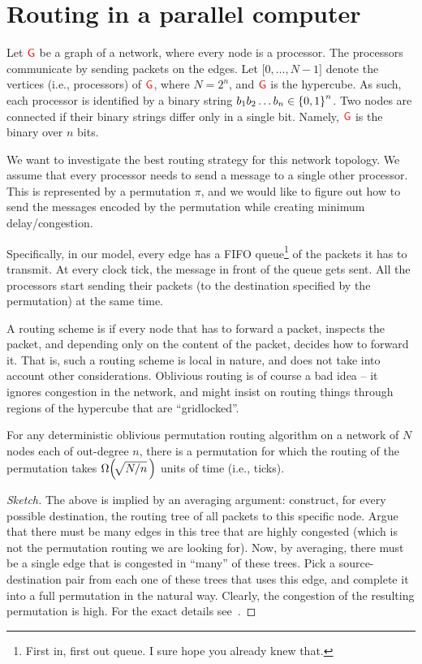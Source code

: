 \section{Routing in a parallel computer}


Let ${\textcolor{red}{\mathsf{G}}}$ be a graph of a network, where every node is a processor.
The processors communicate by sending packets on the edges. Let
$\bigl[0, \ldots, N -1 \bigr]$ denote the vertices (i.e., processors)
of ${\textcolor{red}{\mathsf{G}}}$, where $N = 2^n$, and ${\textcolor{red}{\mathsf{G}}}$ is the hypercube. As such,
each processor is identified by a binary string
$b_1b_2\ldots b_n \in \left\{ {0,1} \right\}^n$. Two nodes are connected if their
binary strings differ only in a single bit. Namely, ${\textcolor{red}{\mathsf{G}}}$ is the
binary  over $n$ bits.

We want to investigate the best routing strategy for this network
topology. We assume that every processor needs to send a message to a
single other processor. This is represented by a permutation $\pi$,
and we would like to figure out how to send the messages encoded by
the permutation while creating minimum delay/congestion.

Specifically, in our model, every edge has a FIFO queue\footnote{First
   in, first out queue. I sure hope you already knew that.} of the
packets it has to transmit. At every clock tick, the message in front
of the queue gets sent. All the processors start sending their packets
(to the destination specified by the permutation) at the same time.

A routing scheme is  if every node that has to
forward a packet, inspects the packet, and depending only on the
content of the packet, decides how to forward it. That is, such a
routing scheme is local in nature, and does not take into account
other considerations. Oblivious routing is of course a bad idea -- it
ignores congestion in the network, and might insist on routing things
through regions of the hypercube that are ``gridlocked''.


\begin{theorem}
    For any deterministic oblivious permutation routing algorithm on a
    network of $N$ nodes each of out-degree $n$, there is a
    permutation for which the routing of the permutation takes
    $\Omega\pth{\! \sqrt{N/n}\, }$ units of time (i.e., ticks).
\end{theorem}

\begin{proof}[Sketch]
    The above is implied by an averaging argument: construct, for every
    possible destination, the routing tree of all packets to this specific
    node. Argue that there must be many edges in this tree that are highly
    congested (which is not the permutation routing we are looking for).
    Now, by averaging, there must be a single edge that is congested in
    ``many'' of these trees. Pick a source-destination pair from each one
    of these trees that uses this edge, and complete it into a full
    permutation in the natural way. Clearly, the congestion of the
    resulting permutation is high. For the exact details see~\cite{kkt-tborh-91}.
\end{proof}

